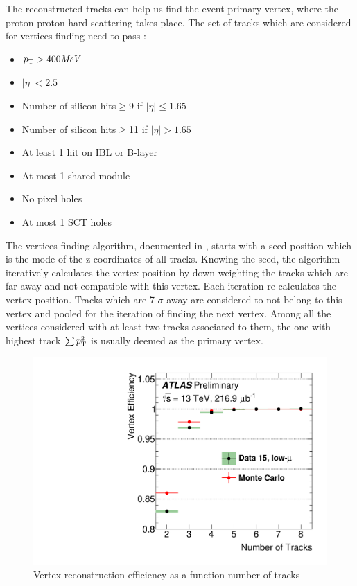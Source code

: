 The reconstructed tracks can help us find the event primary vertex, where the proton-proton hard scattering takes place. The set of tracks which are considered for vertices finding need to pass \cite{ATL-PHYS-PUB-2015-026}:

\begin{itemize}
\item $p_{{\rm T}} > 400 \textit{MeV}$
\item $|\eta|<2.5$
\item Number of silicon hits$\geq$9 if $|\eta|\leq 1.65$
\item Number of silicon hits$\geq$11 if $|\eta|>1.65$
\item At least 1 hit on IBL or B-layer
\item At most 1 shared module
\item No pixel holes
\item At most 1 SCT holes
\end{itemize}

The vertices finding algorithm, documented in \cite{PERF-2015-01}, starts with a seed position which is the mode of the z coordinates of all tracks. Knowing the seed, the algorithm iteratively calculates the vertex position by down-weighting the tracks which are far away and not compatible with this vertex. Each iteration re-calculates the vertex position. Tracks which are 7 $\sigma$ away are considered to not belong to this vertex and pooled for the iteration of finding the next vertex. Among all the vertices considered with at least two tracks associated to them, the one with highest track $\sum p_{{\rm T}}^2$ is usually deemed as the primary vertex.

\begin{figure}[htpb!]
\begin{center}
  \includegraphics[width=0.55\linewidth]{figures/Reco/TrackingVertex}
\caption{Vertex reconstruction efficiency as a function number of tracks\cite{ATL-PHYS-PUB-2015-026}}
\label{fig:reco-primaryvertexeff}
\end{center}
\end{figure}


